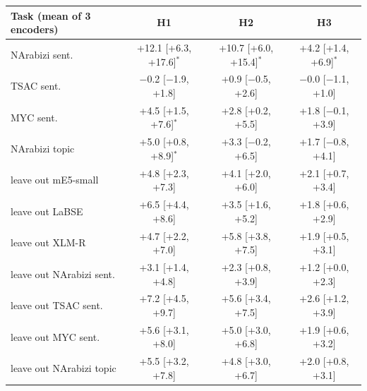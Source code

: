 \begin{tabular}{l ccc}
\toprule
Task (mean of 3 encoders) & H1 & H2 & H3 \\
\midrule
NArabizi sent. & +12.1 [+6.3, +17.6]$^{*}$ & +10.7 [+6.0, +15.4]$^{*}$ & +4.2 [+1.4, +6.9]$^{*}$ \\
TSAC sent. & $-$0.2 [$-$1.9, +1.8] & +0.9 [$-$0.5, +2.6] & $-$0.0 [$-$1.1, +1.0] \\
MYC sent. & +4.5 [+1.5, +7.6]$^{*}$ & +2.8 [+0.2, +5.5] & +1.8 [$-$0.1, +3.9] \\
NArabizi topic & +5.0 [+0.8, +8.9]$^{*}$ & +3.3 [$-$0.2, +6.5] & +1.7 [$-$0.8, +4.1] \\
\midrule
leave out mE5-small & +4.8 [+2.3, +7.3] & +4.1 [+2.0, +6.0] & +2.1 [+0.7, +3.4] \\
leave out LaBSE & +6.5 [+4.4, +8.6] & +3.5 [+1.6, +5.2] & +1.8 [+0.6, +2.9] \\
leave out XLM-R & +4.7 [+2.2, +7.0] & +5.8 [+3.8, +7.5] & +1.9 [+0.5, +3.1] \\
leave out NArabizi sent. & +3.1 [+1.4, +4.8] & +2.3 [+0.8, +3.9] & +1.2 [+0.0, +2.3] \\
leave out TSAC sent. & +7.2 [+4.5, +9.7] & +5.6 [+3.4, +7.5] & +2.6 [+1.2, +3.9] \\
leave out MYC sent. & +5.6 [+3.1, +8.0] & +5.0 [+3.0, +6.8] & +1.9 [+0.6, +3.2] \\
leave out NArabizi topic & +5.5 [+3.2, +7.8] & +4.8 [+3.0, +6.7] & +2.0 [+0.8, +3.1] \\
\bottomrule
\end{tabular}
